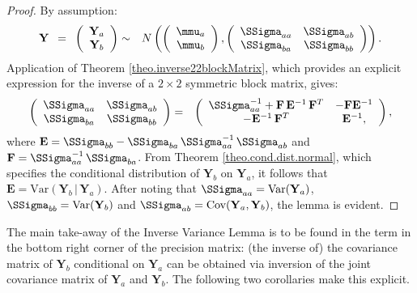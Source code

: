 \documentclass[a4paper]{article}
\theoremstyle{myexamplestyle}
\begin{document}
\begin{proof}
By assumption:
\begin{eqnarray*}
\mathbf{Y} \, \, \, = \, \,\, \left( \begin{array}{c} \mathbf{Y}_a \\ \mathbf{Y}_b \end{array} \right) & \sim &
N \left( \left( \begin{array}{c} \mmu_a \\ \mmu_b \end{array} \right),
\left( \begin{array}{cc} \SSigma_{aa} & \SSigma_{ab} \\ \SSigma_{ba} & \SSigma_{bb} \end{array} \right) \right).
\end{eqnarray*}
Application of Theorem \ref{theo.inverse22blockMatrix}, which provides an explicit expression for the inverse of a $2 \times 2$ symmetric block matrix, gives:
\begin{eqnarray*}
\left( \begin{array}{cc} \SSigma_{aa} & \SSigma_{ab} \\ \SSigma_{ba} & \SSigma_{bb} \end{array} \right)
& = &
\left( \begin{array}{cc} \SSigma_{aa}^{-1} + \mathbf{F} \, \mathbf{E}^{-1} \, \mathbf{F}^T  & - \mathbf{F} \mathbf{E}^{-1}
\\
- \mathbf{E}^{-1} \, \mathbf{F}^T &  \mathbf{E}^{-1},
\end{array}
\right),
\end{eqnarray*}
where $\mathbf{E} = \SSigma_{bb} - \SSigma_{ba}  \, \SSigma_{aa}^{-1}  \, \SSigma_{ab}$ and $\mathbf{F} = \SSigma_{aa}^{-1} \, \SSigma_{ba}$.
From Theorem \ref{theo.cond.dist.normal}, which specifies the conditional distribution of $\mathbf{Y}_b$ on $\mathbf{Y}_a$, it follows that $\mathbf{E} = \mbox{Var}(\mathbf{Y}_{b} \, | \, \mathbf{Y}_a)$. After noting that $\SSigma_{aa} = \mbox{Var}(\mathbf{Y}_a )$, $\SSigma_{bb} = \mbox{Var}(\mathbf{Y}_b )$ and
$\SSigma_{ab} = \mbox{Cov}(\mathbf{Y}_a, \mathbf{Y}_b )$, the lemma is evident.
\end{proof}

The main take-away of the Inverse Variance Lemma is to be found in the term in the bottom right corner of the precision matrix: (the inverse of) the covariance matrix of $\mathbf{Y}_{b}$ conditional on $\mathbf{Y}_a$ can be obtained via inversion of the joint covariance matrix of $ \mathbf{Y}_a$ and $\mathbf{Y}_b$. The following two corollaries make this explicit.
\end{document}
